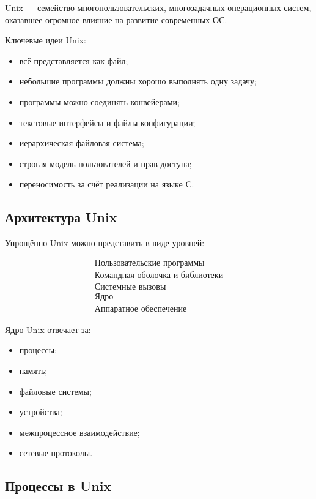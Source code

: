 \documentclass[12pt,a4paper]{article}
\begin{document}
Unix --- семейство многопользовательских, многозадачных операционных систем, оказавшее огромное влияние на развитие современных ОС.

Ключевые идеи Unix:

\begin{itemize}
    \item всё представляется как файл;
    \item небольшие программы должны хорошо выполнять одну задачу;
    \item программы можно соединять конвейерами;
    \item текстовые интерфейсы и файлы конфигурации;
    \item иерархическая файловая система;
    \item строгая модель пользователей и прав доступа;
    \item переносимость за счёт реализации на языке C.
\end{itemize}

\subsection{Архитектура Unix}

Упрощённо Unix можно представить в виде уровней:

\[
\begin{array}{c}
\text{Пользовательские программы} \\
\hline
\text{Командная оболочка и библиотеки} \\
\hline
\text{Системные вызовы} \\
\hline
\text{Ядро} \\
\hline
\text{Аппаратное обеспечение}
\end{array}
\]

Ядро Unix отвечает за:

\begin{itemize}
    \item процессы;
    \item память;
    \item файловые системы;
    \item устройства;
    \item межпроцессное взаимодействие;
    \item сетевые протоколы.
\end{itemize}

\subsection{Процессы в Unix}
\end{document}
